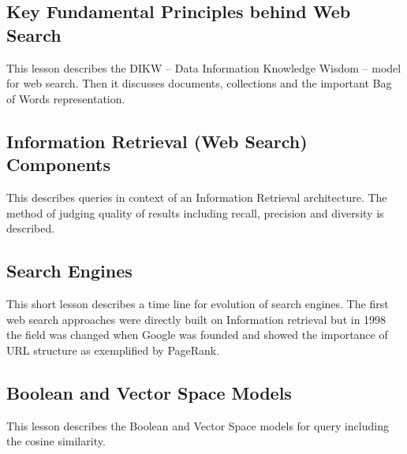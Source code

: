 \subsection{Key Fundamental Principles behind Web
Search}\label{key-fundamental-principles-behind-web-search}


This lesson describes the DIKW -- Data Information Knowledge Wisdom --
model for web search. Then it discusses documents, collections and the
important Bag of Words representation.



\subsection{Information Retrieval (Web Search)
Components}\label{information-retrieval-web-search-components}


This describes queries in context of an Information Retrieval
architecture. The method of judging quality of results including recall,
precision and diversity is described.



\subsection{Search Engines}\label{search-engines}


This short lesson describes a time line for evolution of search engines.
The first web search approaches were directly built on Information
retrieval but in 1998 the field was changed when Google was founded and
showed the importance of URL structure as exemplified by PageRank.



\subsection{Boolean and Vector Space
Models}\label{boolean-and-vector-space-models}


This lesson describes the Boolean and Vector Space models for query
including the cosine similarity.



